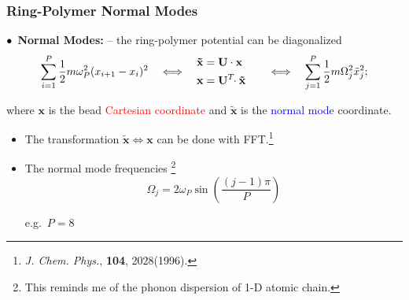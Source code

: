 \begin{frame}
  \frametitle{Ring-Polymer Normal Modes}
  $\bullet\kern1ex$\textbf{Normal Modes:} -- the ring-polymer potential can be diagonalized 
  \begin{equation*}
    \sum_{i=1}^P\frac{1}{2} m\omega_P^2(x_{i+1} - x_i)^2 
    \quad\Longleftrightarrow\quad
    \begin{aligned}
        \mathbf{\tilde{x}} &= \mathbf{U}\cdot \mathbf{x}\cr
        \mathbf{x} &= \mathbf{U}^T\!\!\cdot \mathbf{\tilde{x}}\cr
    \end{aligned}
    \quad\Longleftrightarrow\quad
    \sum_{j=1}^{P}\frac{1}{2} m\Omega_j^2\tilde{x}_j^2;
  \end{equation*}

  where $\mathbf{x}$ is the bead \textcolor{red}{Cartesian coordinate} and $\tilde{\mathbf{x}}$ is the \textcolor{blue}{normal mode}
  coordinate.

  \begin{multicols}{2}
    \begin{itemize}
        \item The transformation $\mathbf{\tilde{x}} \Leftrightarrow \mathbf{x}$
          can be done with FFT.\footnote[frame]{
            \textit{J. Chem. Phys.}, \textbf{104}, 2028(1996).
          }
        \item The normal mode frequencies
        \footnote[frame]{
            This reminds me of the phonon dispersion of 1-D atomic chain.
        }
        \begin{equation*}
            \Omega_j = 2\omega_P \sin\left({\frac{(j-1)\pi}{P}}\right)
        \end{equation*}

        e.g.\ $P = 8$
        \begin{center}
\end{center}
\end{itemize}
\end{multicols}
\end{frame}
